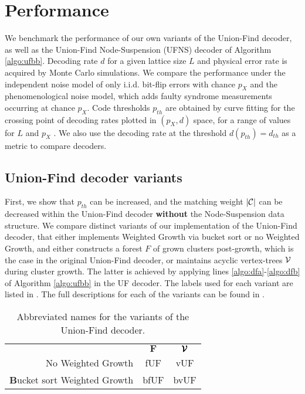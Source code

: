 \section{Performance}\label{sec:performance}

We benchmark the performance of our own variants of the Union-Find decoder, as well as the Union-Find Node-Suspension (UFNS) decoder of Algorithm \ref{algo:ufbb}. Decoding rate $d$ for a given lattice size $L$ and physical error rate is acquired by Monte Carlo simulations. We compare the performance under the independent noise model of only i.i.d. bit-flip errors with chance $p_X$ and the phenomenological noise model, which adds faulty syndrome measurements occurring at chance $p_X$. Code thresholds $p_{th}$ are obtained by curve fitting for the crossing point of decoding rates plotted in $(p_X, d)$ space, for a range of values for $L$ and $p_X$ \cite{wang2003confinement}. We also use the decoding rate at the threshold $d(p_{th})= d_{th}$ as a metric to compare decoders. 

\subsection{Union-Find decoder variants}

First, we show that $p_{th}$ can be increased, and the matching weight $\lvert\mathcal{C}\rvert$ can be decreased within the Union-Find decoder \textbf{without} the Node-Suspension data structure. We compare distinct variants of our implementation of the Union-Find decoder, that either implements Weighted Growth via bucket sort or no Weighted Growth, and either constructs a forest $F$ of grown clusters post-growth, which is the case in the original Union-Find decoder, or maintains acyclic vertex-trees $\mathcal{V}$ during cluster growth. The latter is achieved by applying lines \ref{algo:dfa}-\ref{algo:dfb} of Algorithm \ref{algo:ufbb} in the UF decoder. The labels used for each variant are listed in . The full descriptions for each of the variants can be found in \cite{markthesis}.

\begin{table}[htbp]
  \centering
  \begin{tabularx}{\linewidth} { | R{2} || C{.5} | C{.5} | }
    \hline
    & $\mathbf{F}$ &  $\pmb{\mathcal{V}}$\\
    \hhline{|=::=:=|}
    No Weighted Growth & fUF  & vUF \\
    \hline
    \textbf{B}ucket sort Weighted Growth & bfUF & bvUF \\
    \hline
  \end{tabularx}
  \caption{Abbreviated names for the variants of the Union-Find decoder.}\label{tab:uftable}
\end{table}

